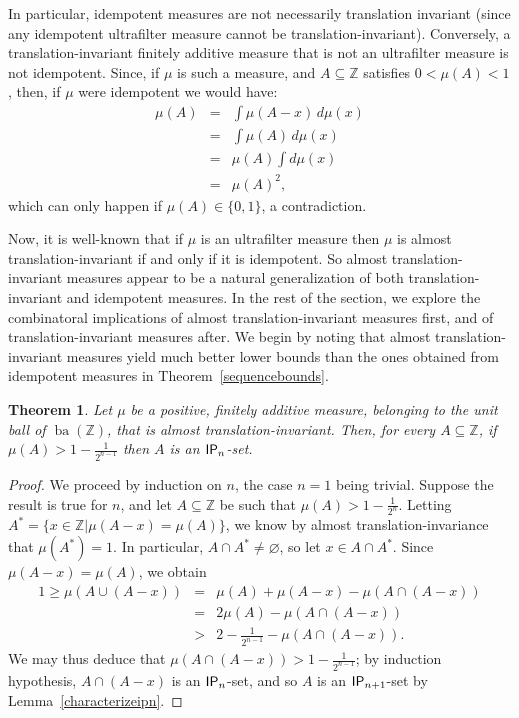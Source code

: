\documentclass{jloganal}
\newtheorem{thm}{Theorem}[section]    %
\theoremstyle{definition}
\newcommand{\ba}{\mathop{\mathrm{ba}}}
\newcommand{\ip}{\mathnormal{\mathsf{IP}}}
\begin{document}
In particular, idempotent measures are not necessarily translation invariant (since any idempotent ultrafilter measure cannot be translation-invariant). Conversely, a translation-invariant finitely additive measure that is not an ultrafilter measure is not idempotent. Since, if $\mu$ is such a measure, and $A\subseteq\mathbb Z$ satisfies $0<\mu(A)<1$, then, if $\mu$ were idempotent we would have:
    \begin{eqnarray*}
        \mu(A) & = & \int \mu(A-x)\,d\mu(x)\\
        &=&\int \mu(A)\,d\mu(x)\\
        &=& \mu(A)\int d\mu(x)\\
        &=& \mu(A)^{2},
    \end{eqnarray*}
    which can only happen if $\mu(A)\in\{0,1\}$, a contradiction.

Now, it is well-known that if $\mu$ is an ultrafilter measure then $\mu$ is almost translation-invariant if and only if it is idempotent. So almost translation-invariant measures appear to be a natural generalization of both translation-invariant and idempotent measures. In the rest of the section, we explore the combinatoral implications of almost translation-invariant measures first, and of translation-invariant measures after. We begin by noting that almost translation-invariant measures yield much better lower bounds than the ones obtained from idempotent measures in Theorem~\ref{sequencebounds}.

\begin{thm}\label{almosttranslationinvariant}
Let $\mu$ be a positive, finitely additive measure, belonging to the unit ball of $\ba(\mathbb Z)$, that is almost translation-invariant. Then, for every $A\subseteq\mathbb Z$, if $\mu(A)>1-\frac{1}{2^{n-1}}$ then $A$ is an $\ip_{n}$-set.
\end{thm}
\begin{proof}
We proceed by induction on $n$, the case $n=1$ being trivial. Suppose the result is true for $n$, and let $A\subseteq\mathbb Z$ be such that $\mu(A)>1-\frac{1}{2^n}$. Letting $A^*=\{x\in\mathbb Z\big|\mu(A-x)=\mu(A)\}$, we know by almost translation-invariance that $\mu(A^*)=1$. In particular, $A\cap A^*\neq\varnothing$, so let $x\in A\cap A^*$. Since $\mu(A-x)=\mu(A)$, we obtain
\begin{eqnarray*}
    1\geq \mu(A\cup(A-x)) & = & \mu(A)+\mu(A-x)-\mu(A\cap(A-x)) \\
    & = & 2\mu(A)-\mu(A\cap(A-x)) \\
    & > & 2-\frac{1}{2^{n-1}}-\mu(A\cap(A-x)).
\end{eqnarray*}
We may thus deduce that $\mu(A\cap(A-x))>1-\frac{1}{2^{n-1}}$; by induction hypothesis, $A\cap(A-x)$ is an $\ip_n$-set, and so $A$ is an $\ip_{n+1}$-set by Lemma~\ref{characterizeipn}.
\end{proof}
\end{document}
